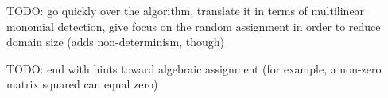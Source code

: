 \begin{problem}
\end{problem}

TODO: go quickly over the algorithm, translate it in terms of multilinear monomial detection, 
give focus on the random assignment in order to reduce domain size (adds non-determinism, though)

TODO: end with hints toward algebraic assignment (for example, a non-zero matrix squared can equal zero)
